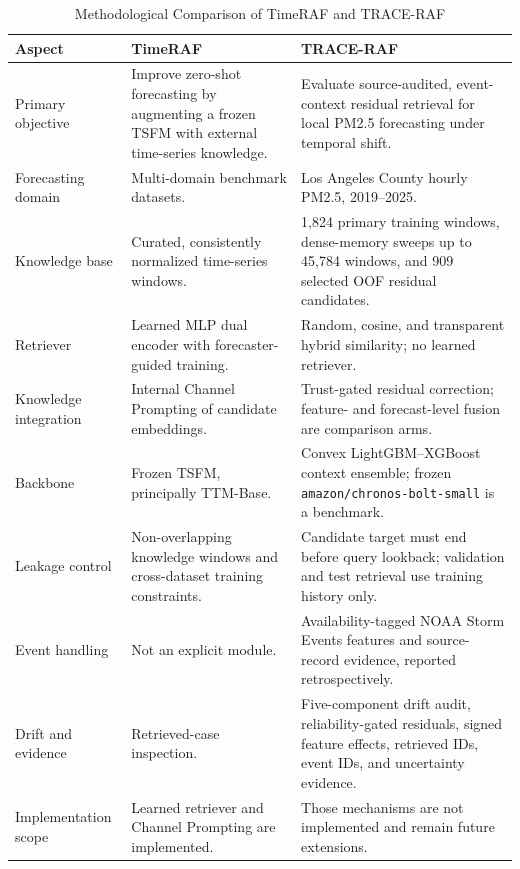 \documentclass{ieeeaccess}
\begin{document}
\begin{table}[!t]
\centering
\caption{Methodological Comparison of TimeRAF and TRACE-RAF}
\label{tab:timeraf_comparison}
\begin{tabular}{p{}p{}p{}}
\toprule
Aspect & TimeRAF & TRACE-RAF \\
\midrule
Primary objective & Improve zero-shot forecasting by augmenting a frozen TSFM
with external time-series knowledge. & Evaluate source-audited, event-context
residual retrieval for local PM2.5 forecasting under temporal shift. \\
Forecasting domain & Multi-domain benchmark datasets. & Los Angeles County
hourly PM2.5, 2019--2025. \\
Knowledge base & Curated, consistently normalized time-series windows. & 1,824
primary training windows, dense-memory sweeps up to 45,784 windows, and 909
selected OOF residual candidates. \\
Retriever & Learned MLP dual encoder with forecaster-guided training. & Random,
cosine, and transparent hybrid similarity; no learned retriever. \\
Knowledge integration & Internal Channel Prompting of candidate embeddings. &
Trust-gated residual correction; feature- and forecast-level fusion are
comparison arms. \\
Backbone & Frozen TSFM, principally TTM-Base. & Convex LightGBM--XGBoost context
ensemble; frozen \texttt{amazon/chronos-bolt-small} is a benchmark. \\
Leakage control & Non-overlapping knowledge windows and cross-dataset training
constraints. & Candidate target must end before query lookback; validation and
test retrieval use training history only. \\
Event handling & Not an explicit module. & Availability-tagged NOAA Storm
Events features and source-record evidence, reported retrospectively. \\
Drift and evidence & Retrieved-case inspection. & Five-component drift
audit, reliability-gated residuals, signed feature effects, retrieved IDs,
event IDs, and uncertainty evidence. \\
Implementation scope & Learned retriever and Channel Prompting are implemented.
& Those mechanisms are not implemented and remain future extensions. \\
\bottomrule
\end{tabular}
\end{table}
\end{document}
